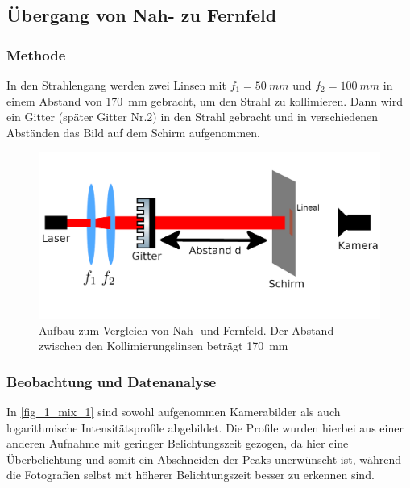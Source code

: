 \documentclass[
	a4paper,
	12pt,
	pagesize,
	ngerman
]{scrartcl}
\begin{document}
	\subsection{Übergang von Nah- zu Fernfeld}

	\subsubsection*{Methode}
	In den Strahlengang werden zwei Linsen mit $f_1=\SI{50}{mm}$ und $f_2=\SI{100}{mm}$ in einem Abstand von \SI{170}{mm} gebracht, um den Strahl zu kollimieren.
  Dann wird ein Gitter (später Gitter Nr.2) in den Strahl gebracht und in verschiedenen Abständen das Bild auf dem Schirm aufgenommen.

		\begin{figure}[H] %
			\includegraphics[width=1\linewidth]{img/nahfern}
					\caption{
						Aufbau zum Vergleich von Nah- und Fernfeld. Der Abstand zwischen den Kollimierungslinsen beträgt \SI{170}{mm}
					}
					\label{fig_nahfern}
			\end{figure}


	\subsubsection*{Beobachtung und Datenanalyse}
	In \cref{fig_1_mix_1} sind sowohl aufgenommen Kamerabilder als auch logarithmische Intensitätsprofile abgebildet.
	Die Profile wurden hierbei aus einer anderen Aufnahme mit geringer Belichtungszeit gezogen, da hier eine Überbelichtung und somit ein Abschneiden der Peaks unerwünscht ist, während die Fotografien selbst mit höherer Belichtungszeit besser zu erkennen sind.
\end{document}
